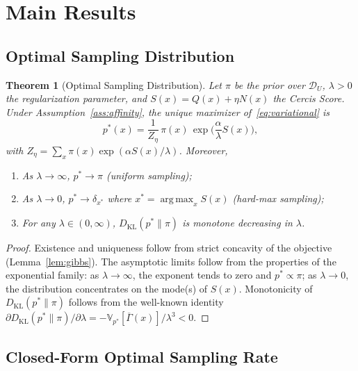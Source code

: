 \documentclass[12pt,a4paper]{article}
\newtheorem{theorem}{Theorem}[section]
\newcommand{\V}{\mathbb{V}}
\newcommand{\cD}{\mathcal{D}}
\newcommand{\argmax}{\operatorname*{arg\,max}}
\newcommand{\KL}{D_{\mathrm{KL}}}
\begin{document}
\section{Main Results}

\subsection{Optimal Sampling Distribution}

\begin{theorem}[Optimal Sampling Distribution]
\label{thm:optimal-dist}
Let $\pi$ be the prior over $\cD_U$, $\lambda>0$ the regularization
parameter, and $S(x)=Q(x)+\eta N(x)$ the Cercis Score.  Under
Assumption~\ref{ass:affinity}, the unique maximizer of~\eqref{eq:variational} is
\begin{equation}\label{eq:thm-dist}
    p^*(x) = \frac{1}{Z_\eta}\,
    \pi(x)\,\exp\!\Big(\frac{\alpha}{\lambda}S(x)\Big),
\end{equation}
with $Z_\eta=\sum_{x}\pi(x)\exp(\alpha S(x)/\lambda)$.  Moreover,
\begin{enumerate}[label=(\roman*)]
    \item As $\lambda\to\infty$, $p^*\to\pi$ (uniform sampling);
    \item As $\lambda\to0$, $p^*\to\delta_{x^*}$ where
          $x^*=\argmax_x S(x)$ (hard-max sampling);
    \item For any $\lambda\in(0,\infty)$, $\KL(p^*\|\pi)$ is monotone
          decreasing in $\lambda$.
\end{enumerate}
\end{theorem}

\begin{proof}
Existence and uniqueness follow from strict concavity of the objective
(Lemma~\ref{lem:gibbs}).  The asymptotic limits follow from the properties of
the exponential family: as $\lambda\to\infty$, the exponent tends to zero and
$p^*\propto\pi$; as $\lambda\to0$, the distribution concentrates on the
mode(s) of $S(x)$.  Monotonicity of $\KL(p^*\|\pi)$ follows from the
well-known identity $\partial\KL(p^*\|\pi)/\partial\lambda =
-\V_{p^*}[\overline{\Gamma}(x)]/\lambda^3<0$.
\end{proof}

\subsection{Closed-Form Optimal Sampling Rate}
\end{document}
